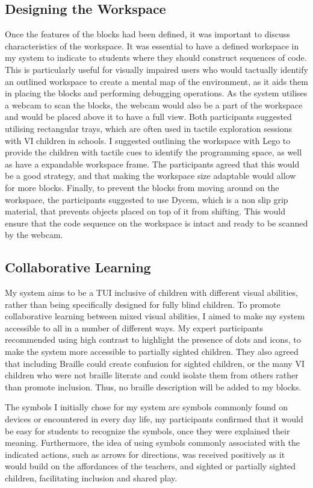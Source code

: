 \documentclass[oneside,%
                    author={Malak Hajji},
                    degree={BSc},
                    title={Designing An Accessible Computational Toolkit For Students},
                  subtitle={With Mixed Visual Abilities}]{dissertation}
\begin{document}
\subsection{Designing the Workspace}
Once the features of the blocks had been defined, it was important to discuss characteristics of the workspace. It was essential to have a defined workspace in my system to indicate to students where they should construct sequences of code. This is particularly useful for visually impaired users who would tactually identify an outlined workspace to create a mental map of the environment, as it aids them in placing the blocks and performing debugging operations. As the system utilises a webcam to scan the blocks, the webcam would also be a part of the workspace and would be placed above it to have a full view. Both participants suggested utilising rectangular trays, which are often used in tactile exploration sessions with VI children in schools. I suggested outlining the workspace with Lego to provide the children with tactile cues to identify the programming space, as well as have a expandable workspace frame. The participants agreed that this would be a good strategy, and that making the workspace size adaptable would allow for more blocks.
Finally, to prevent the blocks from moving around on the workspace, the participants suggested to use Dycem, which is a non slip grip material, that prevents objects placed on top of it from shifting. This would ensure that the code sequence on the workspace is intact and ready to be scanned by the webcam.

\subsection{Collaborative Learning}
My system aims to be a TUI inclusive of children with different visual abilities, rather than being specifically designed for fully blind children. To promote collaborative learning between mixed visual abilities, I aimed to make my system accessible to all in a number of different ways. My expert participants recommended using high contrast to highlight the presence of dots and icons, to make the system more accessible to partially sighted children. They also agreed that including Braille could create confusion for sighted children, or the many VI children who were not braille literate and could isolate them from others rather than promote inclusion. Thus, no braille description will be added to my blocks.

The symbols I initially chose for my system are symbols commonly found on devices or encountered in every day life, my participants confirmed that it would be easy for students to recognize the symbols, once they were explained their meaning. Furthermore, the idea of using symbols commonly associated with the indicated actions, such as arrows for directions, was received positively as it would build on the affordances of the teachers, and sighted or partially sighted children, facilitating inclusion and shared play.
\end{document}
